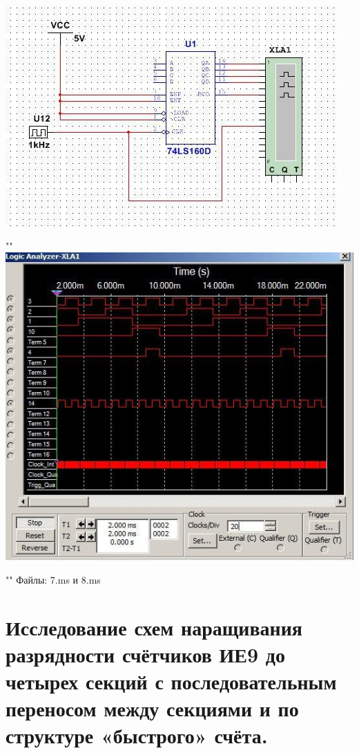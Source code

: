 \documentclass[a4paper,12pt]{article}
\begin{document}
\begin{center}
	\includegraphics[scale=1]{../screens/6_1.jpg}
	
	""\newline\newline
	\includegraphics[scale=0.9]{../screens/6_2.jpg}
\end{center}

""\newline
\noindent Файлы: 7.ms и 8.ms

\section{Исследование схем наращивания разрядности счётчиков ИЕ9 до четырех секций с последовательным переносом между секциями и по структуре «быстрого» счёта.}
\end{document}
